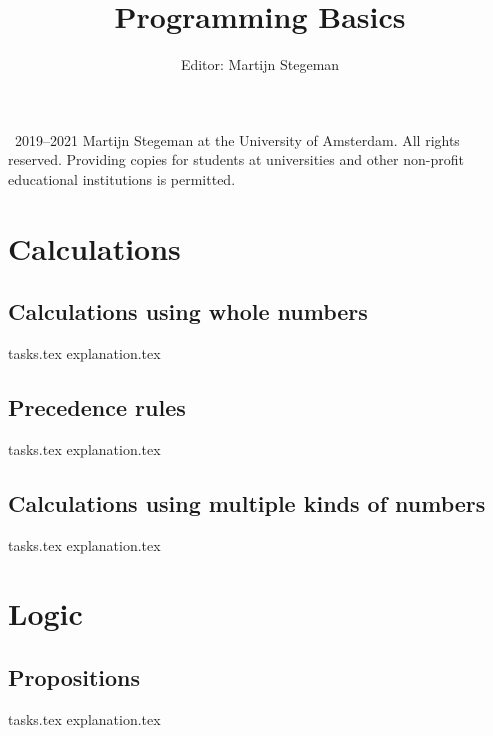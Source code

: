 \def\doclang{english}
\def\langdir{en}




    \title{Programming Basics}
    \author{Editor: Martijn Stegeman}
    \maketitle

    \textcopyright\ 2019--2021 Martijn Stegeman at the University of Amsterdam. All rights reserved. Providing copies for students at universities and other non-profit educational institutions is permitted.

    \tableofcontents

    \chapter{Calculations}
    \newpage

    \section{Calculations using whole numbers}
    {tasks.tex}          \newpage
    {explanation.tex}       \newpage

    \section{Precedence rules}
    {tasks.tex}        \newpage
    {explanation.tex}     \newpage

    \section{Calculations using multiple kinds of numbers}
    {tasks.tex}            \newpage
    {explanation.tex}         \newpage

    \chapter{Logic}
    \newpage

    \section{Propositions}
    {tasks.tex}         \newpage
    {explanation.tex}      \newpage

